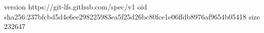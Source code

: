 version https://git-lfs.github.com/spec/v1
oid sha256:237bfcbd5d4e6ee298225983ea5f25d26bc80fce1e06ffdb8976af9654b05418
size 232647
